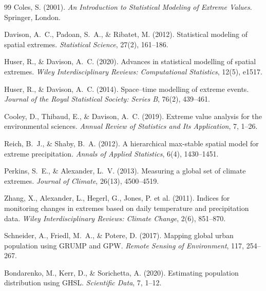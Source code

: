 \documentclass[12pt]{article}
\begin{document}
\begin{thebibliography}{99}
Coles, S. (2001).
\newblock \emph{An Introduction to Statistical Modeling of Extreme Values}.
\newblock Springer, London.

Davison, A.~C., Padoan, S.~A., \& Ribatet, M. (2012).
\newblock Statistical modeling of spatial extremes.
\newblock \emph{Statistical Science}, 27(2), 161--186.

Huser, R., \& Davison, A.~C. (2020).
\newblock Advances in statistical modelling of spatial extremes.
\newblock \emph{Wiley Interdisciplinary Reviews: Computational Statistics}, 12(5), e1517.

Huser, R., \& Davison, A.~C. (2014).
\newblock Space--time modelling of extreme events.
\newblock \emph{Journal of the Royal Statistical Society: Series B}, 76(2), 439--461.

Cooley, D., Thibaud, E., \& Davison, A.~C. (2019).
\newblock Extreme value analysis for the environmental sciences.
\newblock \emph{Annual Review of Statistics and Its Application}, 7, 1--26.

Reich, B.~J., \& Shaby, B.~A. (2012).
\newblock A hierarchical max-stable spatial model for extreme precipitation.
\newblock \emph{Annals of Applied Statistics}, 6(4), 1430--1451.

Perkins, S.~E., \& Alexander, L.~V. (2013).
\newblock Measuring a global set of climate extremes.
\newblock \emph{Journal of Climate}, 26(13), 4500--4519.

Zhang, X., Alexander, L., Hegerl, G., Jones, P. et al. (2011).
\newblock Indices for monitoring changes in extremes based on daily temperature and precipitation data.
\newblock \emph{Wiley Interdisciplinary Reviews: Climate Change}, 2(6), 851--870.

Schneider, A., Friedl, M.~A., \& Potere, D. (2017).
\newblock Mapping global urban population using GRUMP and GPW.
\newblock \emph{Remote Sensing of Environment}, 117, 254--267.

Bondarenko, M., Kerr, D., \& Sorichetta, A. (2020).
\newblock Estimating population distribution using GHSL.
\newblock \emph{Scientific Data}, 7, 1--12.


\end{thebibliography}
\end{document}
